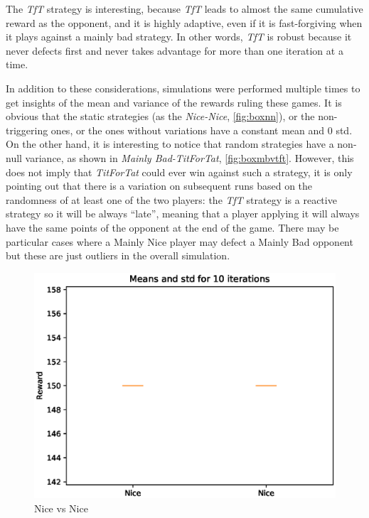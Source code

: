 \documentclass[journal,10pt,twoside]{IEEEtran}
\begin{document}
The \textit{TfT} strategy is interesting, because \textit{TfT} leads to almost the same cumulative reward as the opponent, and it is highly adaptive, even if it is fast-forgiving when it plays against a mainly bad strategy. In other words, \textit{TfT} is robust because it never defects first and never takes advantage for more than one iteration at a time.~\cite{fogelEvolvingBehaviors}

In addition to these considerations, simulations were performed multiple times to get insights of the mean and variance of the rewards ruling these games. It is obvious that the static strategies (as the \textit{Nice-Nice}, \autoref{fig:boxnn}), or the non-triggering ones, or the ones without variations have a constant mean and $0$ std. On the other hand, it is interesting to notice that random strategies have a non-null variance, as shown in \textit{Mainly Bad-TitForTat}, \autoref{fig:boxmbvtft}. However, this does not imply that \textit{TitForTat} could ever win against such a strategy, it is only pointing out that there is a variation on subsequent runs based on the randomness of at least one of the two players: the \textit{TfT} strategy is a reactive strategy so it will be always ``late'', meaning that a player applying it will always have the same points of the opponent at the end of the game. There may be particular cases where a Mainly Nice player may defect a Mainly Bad opponent but these are just outliers in the overall simulation.

\begin{figure}[!ht]
    \centering
    \includegraphics[width=.7\columnwidth]{../img/ipd2p/ipd2p-boxplot-Nice-Nice}
    \caption{Nice vs Nice}
    \label{fig:boxnn}
\end{figure}
\end{document}

